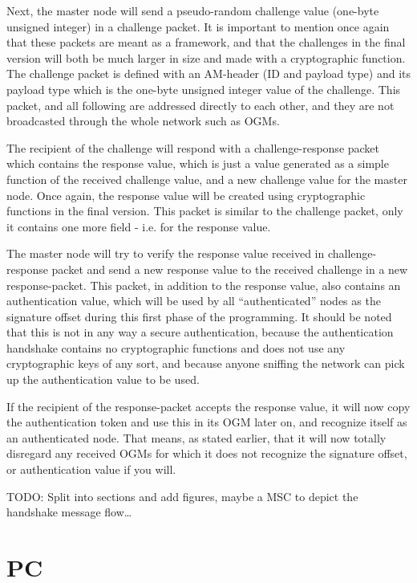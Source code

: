 Next, the master node will send a pseudo-random challenge value (one-byte
unsigned integer) in a challenge packet. It is important to mention once
again that these packets are meant as a framework, and that the challenges in
the final version will both be much larger in size and made with a
cryptographic function. The challenge packet is defined with an \ac{AM}-header
(ID and payload type) and its payload type which is the one-byte unsigned
integer value of the challenge. This packet, and all following are addressed
directly to each other, and they are not broadcasted through the whole network
such as \acp{OGM}.

The recipient of the challenge will respond with a challenge-response packet
which contains the response value, which is just a value generated as a simple
function of the received challenge value, and a new challenge value for the
master node. Once again, the response value will be created using
cryptographic functions in the final version. This packet is similar to the
challenge packet, only it contains one more field - i.e. for the response value.

The master node will try to verify the response value received in
challenge-response packet and send a new response value to the received
challenge in a new response-packet. This packet, in addition to the response
value, also contains an authentication value, which will be used by all
``authenticated'' nodes as the signature offset during this first phase of the
programming. It should be noted that this is not in any way a secure
authentication, because the authentication handshake contains no cryptographic
functions and does not use any cryptographic keys of any sort, and because
anyone sniffing the network can pick up the authentication value to be used.

If the recipient of the response-packet accepts the response value, it will now
copy the authentication token and use this in its \ac{OGM} later on, and
recognize itself as an authenticated node. That means, as stated earlier, that
it will now totally disregard any received \acp{OGM} for which it does not
recognize the signature offset, or authentication value if you will.

TODO: Split into sections and add figures, maybe a MSC to depict the handshake
message flow\ldots

\section{\acf{PC}}

